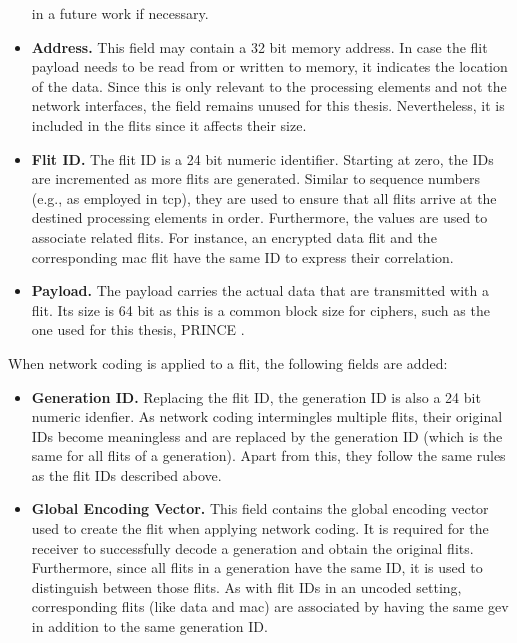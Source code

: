 \begin{itemize}
        in a future work if necessary.
    \item \textbf{Address.} This field may contain a 32 bit memory address. In case the flit payload needs to be read from or written to memory, it
        indicates the location of the data. Since this is only relevant to the processing elements and not the network interfaces, the field remains
        unused for this thesis. Nevertheless, it is included in the flits since it affects their size.
    \item \textbf{Flit ID.} The flit ID is a 24 bit numeric identifier. Starting at zero, the IDs are incremented as more flits are generated.
        Similar to sequence numbers (e.g., as employed in \gls{tcp}), they are used to ensure that all flits arrive at the destined processing
        elements in order. Furthermore, the values are used to associate related flits. For instance, an encrypted data flit and the corresponding \gls{mac}
        flit have the same ID to express their correlation.
    \item \textbf{Payload.} The payload carries the actual data that are transmitted with a flit. Its size is 64 bit as this is a common block size
        for ciphers, such as the one used for this thesis, PRINCE \cite{borghoff12prince}.
\end{itemize}
\vspace{0.5\baselineskip}

When network coding is applied to a flit, the following fields are added:
\begin{itemize}
    \item \textbf{Generation ID.} Replacing the flit ID, the generation ID is also a 24 bit numeric idenfier. As network coding intermingles multiple
        flits, their original IDs become meaningless and are replaced by the generation ID (which is the same for all flits of a generation). Apart
        from this, they follow the same rules as the flit IDs described above.
    \item \textbf{Global Encoding Vector.} This field contains the global encoding vector used to create the flit when applying network coding. It is
        required for the receiver to successfully decode a generation and obtain the original flits. Furthermore, since all flits in a generation have
        the same ID, it is used to distinguish between those flits. As with flit IDs in an uncoded setting, corresponding flits (like data and
        \gls{mac}) are associated by having the same \gls{gev} in addition to the same generation ID.
\end{itemize}
\vspace{0.5\baselineskip}

